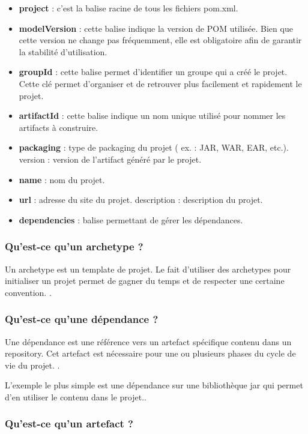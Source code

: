 \begin{itemize}

\item \textbf{project} : c'est la balise racine de tous les fichiers pom.xml.
\item \textbf{modelVersion} : cette balise indique la version de POM utilisée. Bien que cette version ne change pas fréquemment, elle est obligatoire afin de garantir la stabilité d'utilisation.
\item \textbf{groupId} : cette balise permet d'identifier un groupe qui a créé le projet. Cette clé permet d'organiser et de retrouver plus facilement et rapidement le projet.
\item \textbf{artifactId} : cette balise indique un nom unique utilisé pour nommer les artifacts à construire.
\item \textbf{packaging} : type de packaging du projet ( ex. : JAR, WAR, EAR, etc.).
version : version de l'artifact généré par le projet.
\item \textbf{name} : nom du projet.
\item \textbf{url} : adresse du site du projet.
description : description du projet.
\item \textbf{dependencies} : balise permettant de gérer les dépendances.
\end{itemize}

\subsubsection{Qu'est-ce qu'un archetype ?}
Un archetype est un template de projet. Le fait d'utiliser des archetypes pour initialiser un projet permet de gagner du temps et de respecter une certaine convention. \cite{maven}.

\subsubsection{Qu'est-ce qu'une dépendance ?}
 Une dépendance est une référence vers un artefact spécifique contenu dans un repository. Cet artefact est nécessaire pour une ou plusieurs phases du cycle de vie du projet. \cite{maven}.
 
 L'exemple le plus simple est une dépendance sur une bibliothèque jar qui permet d'en utiliser le contenu dans le projet.\parencite{maven}.
 
 \subsubsection{Qu'est-ce qu'un artefact ?}
 
